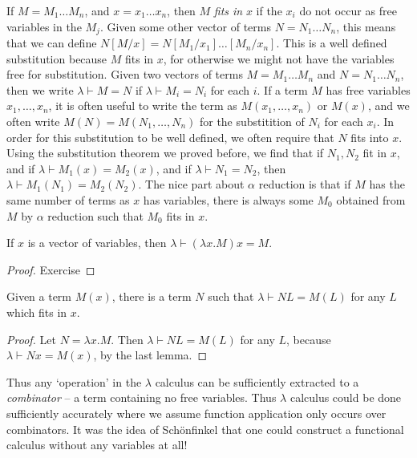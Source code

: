 If $M = M_1 \dots M_n$, and $x = x_1 \dots x_n$, then $M$ \emph{fits in} $x$ if the $x_i$ do not occur as free variables in the $M_j$. Given some other vector of terms $N = N_1 \dots N_n$, this means that we can define $N[M/x] = N[M_1/x_1] \dots [M_n/x_n]$. This is a well defined substitution because $M$ fits in $x$, for otherwise we might not have the variables free for substitution. Given two vectors of terms $M = M_1 \dots M_n$ and $N = N_1 \dots N_n$, then we write $\lambda \vdash M = N$ if $\lambda \vdash M_i = N_i$ for each $i$. If a term $M$ has free variables $x_1, \dots, x_n$, it is often useful to write the term as $M(x_1, \dots, x_n)$ or $M(x)$, and we often write $M(N) = M(N_1, \dots, N_n)$ for the substitition of $N_i$ for each $x_i$. In order for this substitution to be well defined, we often require that $N$ fits into $x$. Using the substitution theorem we proved before, we find that if $N_1,N_2$ fit in $x$, and if $\lambda \vdash M_1(x) = M_2(x)$, and if $\lambda \vdash N_1 = N_2$, then $\lambda \vdash M_1(N_1) = M_2(N_2)$. The nice part about $\alpha$ reduction is that if $M$ has the same number of terms as $x$ has variables, there is always some $M_0$ obtained from $M$ by $\alpha$ reduction such that $M_0$ fits in $x$.

\begin{lemma}
    If $x$ is a vector of variables, then $\lambda \vdash (\lambda x.M)x = M$.
\end{lemma}
\begin{proof} Exercise \end{proof}

\begin{theorem}
    Given a term $M(x)$, there is a term $N$ such that $\lambda \vdash NL = M(L)$ for any $L$ which fits in $x$.
\end{theorem}
\begin{proof}
    Let $N = \lambda x.M$. Then $\lambda \vdash NL = M(L)$ for any $L$, because $\lambda \vdash Nx = M(x)$, by the last lemma.
\end{proof}

Thus any `operation' in the $\lambda$ calculus can be sufficiently extracted to a \emph{combinator} -- a term containing no free variables. Thus $\lambda$ calculus could be done sufficiently accurately where we assume function application only occurs over combinators. It was the idea of Sch\"{o}nfinkel that one could construct a functional calculus without any variables at all!